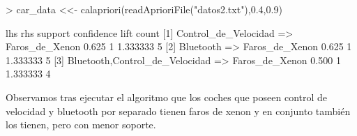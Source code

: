 \documentclass [a4paper] {article}
\begin{document}
\begin{Schunk}
\begin{Sinput}
> car_data <<- calapriori(readAprioriFile("datos2.txt"),0.4,0.9)
\end{Sinput}
\begin{Soutput}
    lhs                                 rhs              support confidence lift     count
[1] {Control_de_Velocidad}           => {Faros_de_Xenon} 0.625   1          1.333333 5    
[2] {Bluetooth}                      => {Faros_de_Xenon} 0.625   1          1.333333 5    
[3] {Bluetooth,Control_de_Velocidad} => {Faros_de_Xenon} 0.500   1          1.333333 4    
\end{Soutput}
\end{Schunk}
Observamos tras ejecutar el algoritmo que los coches que poseen control de velocidad y bluetooth por separado tienen faros de xenon y en conjunto también los tienen,
 pero con menor soporte.
\end{document}
